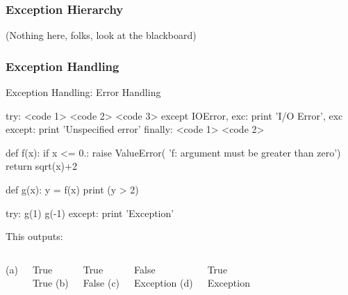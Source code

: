 \begin{frame}[fragile]
\frametitle{Exception Hierarchy}

(Nothing here, folks, look at the blackboard)

\end{frame}

\begin{frame}[fragile]
\frametitle{Exception Handling}

\begin{block}{Exception Handling: Error Handling}
\begin{python}
try:
    <code 1>
    <code 2>
    <code 3>
except IOError, exc:
    print 'I/O Error', exc
except:
    print 'Unspecified error'
finally:
    <code 1>
    <code 2>
\end{python}
\end{block}
\end{frame}

\begin{frame}[fragile]

\begin{python}
def f(x):
    if x <= 0.:
        raise ValueError(
            'f: argument must be greater than zero')
    return sqrt(x)+2

def g(x):
    y = f(x)
    print (y > 2) 

try:
    g(1)
    g(-1)
except:
    print 'Exception'
\end{python}

This outputs:

\begin{columns}
(a)\par
True\\True
{}
(b)\par
True\\False
{}
(c)\par
False\\Exception
{}
(d)\par
True\\Exception
\end{columns}

\end{frame}



